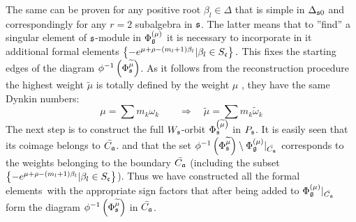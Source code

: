 \documentclass[12pt]{article}
\begin{document}
The same can be proven for any positive root $\beta _{l}\in \Delta $ that is
simple in $\Delta _{\frak{s}0}$ and correspondingly for any $r=2$ subalgebra
in $\frak{s}$. The latter means that to ''find'' a singular element of $%
\frak{s}$-module in $\Phi _{\frak{g}}^{\left( \mu \right) }$ it is necessary
to incorporate in it additional formal elements $\left\{ -e^{\mu +\rho
-\left( m_{l}+1\right) \beta _{l}}|\beta _{l}\in S_{\frak{c}}\right\}.$ This
fixes the starting edges of the diagram $\phi ^{-1}\left( \Phi _{\frak{s}}^{%
\widetilde{\mu }}\right) $. As it follows from the reconstruction procedure
the highest weight $\widetilde{\mu }$ is totally defined by the weight $\mu $%
, they have the same Dynkin numbers:
\begin{equation}
\mu =\sum m_{k}\omega _{k}\qquad \Longrightarrow \quad \widetilde{\mu }=\sum
m_{k}\widetilde{\omega }_{k}  \label{new h weight}
\end{equation}
The next step is to construct the full $W_{\frak{s}}$-orbit $\Phi _{\frak{s}%
}^{\left( \widetilde{\mu }\right) }$  in $P_{\frak{s}}$. It is easily seen
that its coimage belongs to $\bar{C_{\frak{a}}}$. and that the set $\phi
^{-1}\left( \Phi _{\frak{s}}^{\widetilde{\mu }}\right) \setminus \Phi _{%
\frak{g}}^{\left( \mu \right) }|_{\bar{C_{\frak{a}}}}$ corresponds to the
weights belonging to the boundary $\bar{C_{\frak{a}}}$ (including the subset
$\left\{ -e^{\mu +\rho -\left( m_{l}+1\right) \beta _{l}}|\beta _{l}\in S_{%
\frak{c}}\right\} $). Thus we have constructed all the formal elements\ with
the appropriate sign factors that after being added to $\Phi _{\frak{g}%
}^{\left( \mu \right) }|_{\bar{C_{\frak{a}}}}$ form the diagram $\phi
^{-1}\left( \Phi _{\frak{s}}^{\widetilde{\mu }}\right) $ in $\bar{C_{\frak{a}%
}}$.
\end{document}

